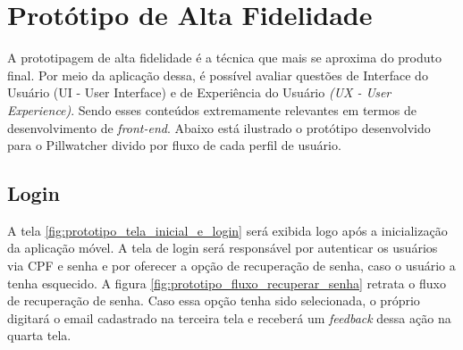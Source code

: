 \section{Protótipo de Alta Fidelidade}
A prototipagem de alta fidelidade é a técnica que mais se aproxima do produto final. Por meio da aplicação dessa, é possível avaliar questões de Interface do Usuário (UI -  User Interface) e de Experiência do Usuário \textit{(UX - User Experience)}. Sendo esses conteúdos extremamente relevantes em termos de desenvolvimento de \textit{front-end}. Abaixo está ilustrado o protótipo desenvolvido para o Pillwatcher divido por fluxo de cada perfil de usuário.  

\subsection{Login}

A tela \ref{fig:prototipo_tela_inicial_e_login} será exibida logo após a inicialização da aplicação móvel. A tela de login será responsável por autenticar os usuários via CPF e senha e por oferecer a opção de recuperação de senha, caso o usuário a tenha esquecido. A figura \ref{fig:prototipo_fluxo_recuperar_senha} retrata o fluxo de recuperação de senha. Caso essa opção tenha sido selecionada, o próprio digitará o email cadastrado na terceira tela e receberá um \textit{feedback} dessa ação na quarta tela.

\begin{figure}[H]
    \centering
\end{figure}
    
